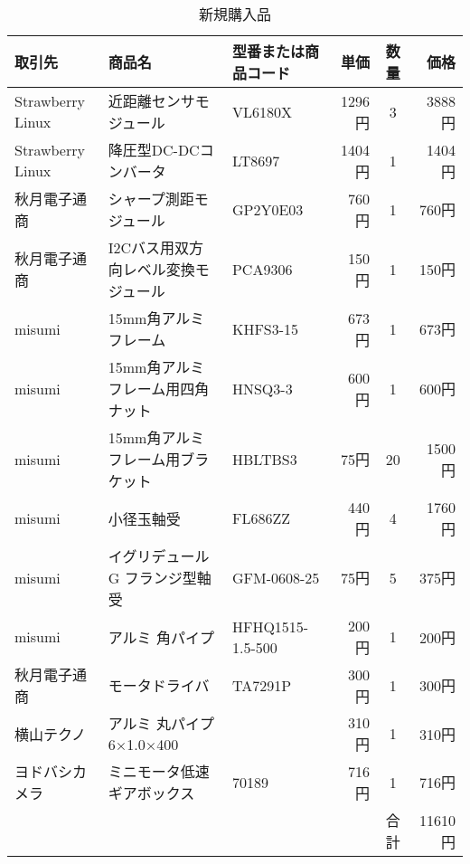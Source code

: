 \newpage
\begin{table}[H]
 \begin{center}
  \caption{新規購入品}
  \label{tab:list2}
  \begin{tabular}{|l|l|l|r|c|r|}  \hline
   取引先 & 商品名 & 型番または商品コード & 単価 & 数量 & 価格 \\   \hline \hline
   Strawberry Linux & 近距離センサモジュール & VL6180X & 1296円 & 3 & 3888円 \\    \hline
   Strawberry Linux & 降圧型DC-DCコンバータ & LT8697 & 1404円 & 1 & 1404円  \\      \hline
   秋月電子通商 & シャープ測距モジュール & GP2Y0E03 & 760円 & 1 & 760円  \\      \hline
   秋月電子通商 & I2Cバス用双方向レベル変換モジュール & PCA9306 & 150円 & 1 & 150円  \\      \hline
   misumi & 15mm角アルミフレーム & KHFS3-15 & 673円 & 1 & 673円  \\      \hline
   misumi & 15mm角アルミフレーム用四角ナット & HNSQ3-3 & 600円 & 1 & 600円  \\       \hline
   misumi & 15mm角アルミフレーム用ブラケット & HBLTBS3 & 75円 & 20 & 1500円  \\      \hline
   misumi & 小径玉軸受 & FL686ZZ & 440円 & 4 & 1760円  \\      \hline
   misumi & イグリデュールG フランジ型軸受 & GFM-0608-25 & 75円 & 5 & 375円 \\     \hline
   misumi & アルミ 角パイプ & HFHQ1515-1.5-500 & 200円 & 1 & 200円  \\       \hline
   秋月電子通商 & モータドライバ & TA7291P & 300円 & 1 & 300円  \\      \hline
   横山テクノ & アルミ 丸パイプ 6×1.0×400 & & 310円 & 1 & 310円 \\        \hline
   ヨドバシカメラ & ミニモータ低速ギアボックス & 70189 & 716円 & 1 & 716円  \\      \hline
   & & & & 合計 & 11610円  \\      \hline
  \end{tabular}
 \end{center}
\end{table}
